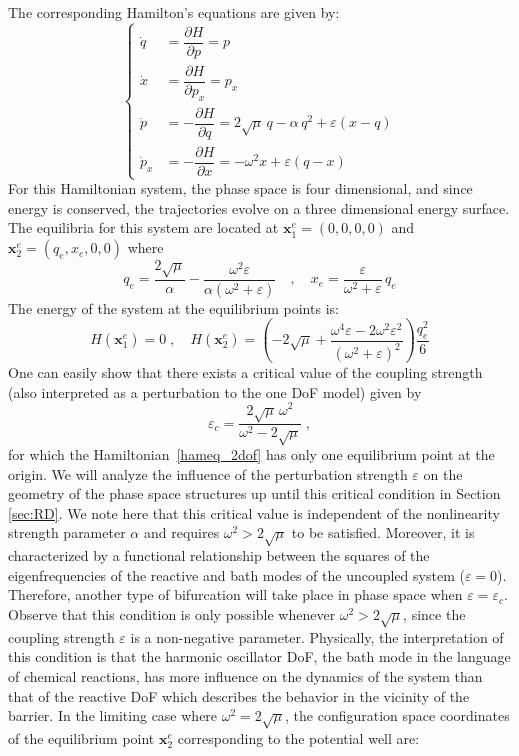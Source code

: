 \documentclass{ws-ijbc}
\begin{document}
The corresponding Hamilton's equations are given by:
\begin{equation}
\left\{
\begin{aligned}
\dot{q} &= \dfrac{\partial H}{\partial p} =  p \\[.1cm]
\dot{x} &= \dfrac{\partial H}{\partial p_x} = p_x \\[.1cm]
\dot{p} &= -\dfrac{\partial H}{\partial q} =  2\sqrt{\mu} \, q - \alpha \, q^2 + \varepsilon (x - q) \\[.1cm]
\dot{p}_x &= -\dfrac{\partial H}{\partial x} = -\omega^2 x + \varepsilon (q-x) 
\end{aligned}
\right.
\label{hameq_2dof}
\end{equation}
For this Hamiltonian system, the phase space is four dimensional, and since energy is conserved, the trajectories evolve on a three dimensional energy surface. The equilibria for this system are located at $\mathbf{x}_1^e = (0,0,0,0)$ and $\mathbf{x}_2^e = \left(q_e,x_e,0,0\right)$
where
\begin{equation}
q_e = \frac{2\sqrt{\mu}}{\alpha} - \frac{\omega^2\varepsilon}{\alpha(\omega^2 + \varepsilon)} \quad,\quad x_e = \frac{\varepsilon}{\omega^2 +\varepsilon}\, q_e
\label{cSpace_eqCoords}
\end{equation}
The energy of the system at the equilibrium points is:
\begin{equation}
H(\mathbf{x}_1^e) = 0 \;,\quad H(\mathbf{x}_2^e) = \left(-2\sqrt{\mu} + \frac{\omega^4 \varepsilon - 2\omega^2\varepsilon^2}{\left(\omega^2 + \varepsilon\right)^2} \right) \frac{q_e^2}{6}
\label{energy_eqpts}
\end{equation}
One can easily show that there exists a critical value of the coupling strength (also interpreted as a perturbation to the one DoF model) given by
\begin{equation}
\varepsilon_c = \dfrac{2\sqrt{\mu} \, \omega^2}{\omega^2 - 2\sqrt{\mu}} \;,
\label{crit_epsi}
\end{equation}
for which the Hamiltonian~\eqref{hameq_2dof} has only one equilibrium point at the origin. We will analyze the influence of the perturbation strength $\varepsilon$ on the geometry of the phase space structures up until this critical condition in Section \ref{sec:RD}. We note here that this critical value is independent of the nonlinearity strength parameter $\alpha$ and requires $\omega^2 > 2\sqrt{\mu}$ to be satisfied. Moreover, it is characterized by a functional relationship between the squares of the eigenfrequencies of the reactive and bath modes of the uncoupled system ($\varepsilon = 0$). Therefore, another type of bifurcation will take place in phase space when $\varepsilon = \varepsilon_c$. Observe that this condition is only possible whenever $\omega^2 > 2 \sqrt{\mu}$, since the coupling strength $\varepsilon$ is a non-negative parameter. Physically, the interpretation of this condition is that the harmonic oscillator DoF, the bath mode in the language of chemical reactions, has more influence on the dynamics of the system than that of the reactive DoF which describes the behavior in the vicinity of the barrier. In the limiting case where $\omega^2 = 2\sqrt{\mu}$, the configuration space coordinates of the equilibrium point $\mathbf{x}_2^e$ corresponding to the potential well are:
\end{document}
